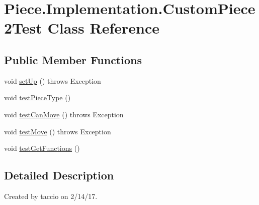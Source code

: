\hypertarget{classPiece_1_1Implementation_1_1CustomPiece2Test}{\section{Piece.\-Implementation.\-Custom\-Piece2\-Test Class Reference}
\label{classPiece_1_1Implementation_1_1CustomPiece2Test}
}
\subsection*{Public Member Functions}
\begin{DoxyCompactItemize}
\item 
void \hyperlink{classPiece_1_1Implementation_1_1CustomPiece2Test_a4ebb52055472a7626562c9706eeca579}{set\-Up} ()  throws Exception 
\item 
void \hyperlink{classPiece_1_1Implementation_1_1CustomPiece2Test_a0388f0ad766b662b9bc875166c85df8c}{test\-Piece\-Type} ()
\item 
void \hyperlink{classPiece_1_1Implementation_1_1CustomPiece2Test_ab3c717c9cd78e9a8fe91e95d63bfcf1e}{test\-Can\-Move} ()  throws Exception
\item 
void \hyperlink{classPiece_1_1Implementation_1_1CustomPiece2Test_a5f6e2e14e6a8f1c631d30b5f1a68707a}{test\-Move} ()  throws Exception
\item 
void \hyperlink{classPiece_1_1Implementation_1_1CustomPiece2Test_afdaa72c5ea2ec0d4ec336ca9e37307ee}{test\-Get\-Functions} ()
\end{DoxyCompactItemize}


\subsection{Detailed Description}
Created by taccio on 2/14/17. 

